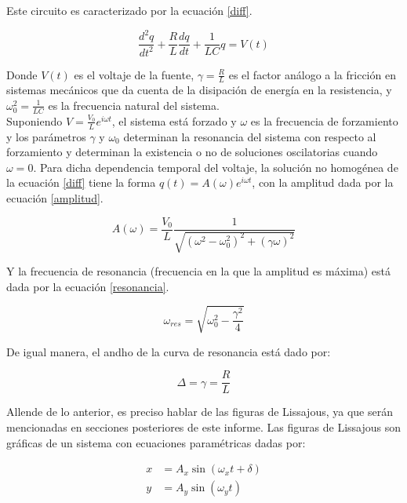 \documentclass[prb,aps,twocolumn,preprintnumbers,amsmath,amssymb]{revtex4}
\begin{document}
Este circuito es caracterizado por la ecuación \eqref{diff}.

\begin{equation}
\label{diff}
\frac{d^2 q}{d t^2} + \frac{R}{L}\frac{d q}{d t} + \frac{1}{LC}q = V(t)
\end{equation}

Donde $V(t)$ es el voltaje de la fuente, $\gamma = \frac{R}{L}$ es el factor análogo a la fricción en sistemas mecánicos que da cuenta de la disipación de energía en la resistencia, y $\omega_{0}^2 = \frac{1}{LC}$ es la frecuencia natural del sistema.\\

Suponiendo $V = \frac{V_{0}}{L} e^{i\omega t}$, el sistema está forzado y $\omega$ es la frecuencia de forzamiento y los parámetros $\gamma$ y $\omega_{0}$ determinan la resonancia del sistema con respecto al forzamiento  y determinan la existencia o no de soluciones oscilatorias cuando $\omega = 0$. Para dicha dependencia temporal del voltaje, la solución no homogénea de la ecuación \eqref{diff} tiene la forma $q(t) = A(\omega) e^{i \omega t}$, con la amplitud dada por la ecuación \eqref{amplitud}.

\begin{equation}
\label{amplitud}
A(\omega) = \frac{V_{0}}{L}\frac{1}{\sqrt{(\omega^2 - \omega_{0}^2)^2+(\gamma \omega)^2}}
\end{equation}

Y la frecuencia de resonancia (frecuencia en la que la amplitud es máxima) está dada por la ecuación \eqref{resonancia}.

\begin{equation}
\label{resonancia}
\omega_{res} = \sqrt{\omega_{0}^2 - \frac{\gamma^2}{4}}
\end{equation}

De igual manera, el andho de la curva de resonancia está dado por:

\begin{equation}
\label{ancho}
\Delta = \gamma = \frac{R}{L}
\end{equation}

Allende de lo anterior, es preciso hablar de las figuras de Lissajous, ya que serán mencionadas en secciones posteriores de este informe. Las figuras de Lissajous son gráficas de un sistema con ecuaciones paramétricas dadas por:

\begin{equation}
\label{lissa}
\begin{split}
x &= A_{x}\sin(\omega_{x}t + \delta)\\
y &= A_{y}\sin(\omega_{y}t)
\end{split}
\end{equation}
\end{document}
